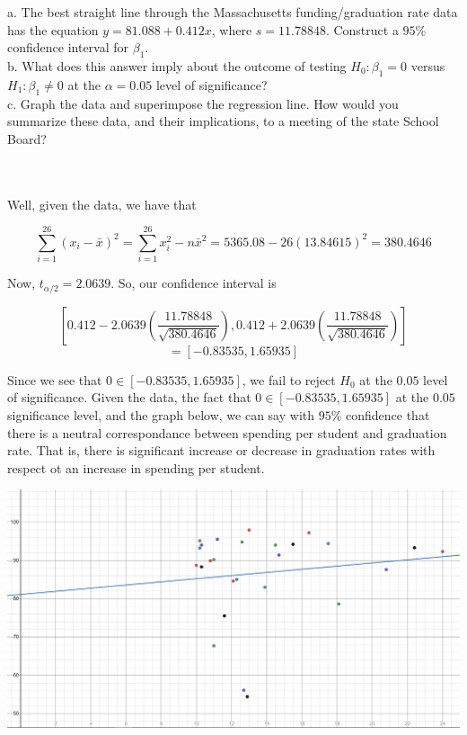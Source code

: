 a. The best straight line through the Massachusetts funding/graduation rate data has the equation
$y=81.088+0.412x$, where $s=11.78848$. Construct a $95\%$ confidence interval for $\beta_1$.\\

b. What does this answer imply about the outcome of testing $H_0:\beta_1=0$ versus $H_1:\beta_1\neq0$ at
the $\alpha=0.05$ level of significance?\\

c. Graph the data and superimpose the regression line. How would you summarize these data, and their
implications, to a meeting of the state School Board?\\\\

\begin{solution}\renewcommand{\qedsymbol}{}\ \\
    Well, given the data, we have that
    
    $$\sum_{i=1}^26(x_i-\bar{x})^2=\sum_{i=1}^26x_i^2-n\bar{x}^2=5365.08-26(13.84615)^2=380.4646$$
    
    Now, $t_{\alpha/2}=2.0639$. So, our confidence interval is
    
    $$[0.412-2.0639(\frac{11.78848}{\sqrt{380.4646}}), 0.412+2.0639(\frac{11.78848}{\sqrt{380.4646}})]$$
    $$=[-0.83535, 1.65935]$$

    Since we see that $0\in[-0.83535, 1.65935]$, we fail to reject $H_0$ at the $0.05$ level of
    significance. Given the data, the fact that $0\in[-0.83535, 1.65935]$ at the $0.05$ significance
    level, and the graph below, we can say with $95\%$ confidence that there is a neutral
    correspondance between spending per student and graduation rate. That is, there is significant
    increase or decrease in graduation rates with respect ot an increase in spending per student.

    \begin{center}
        \includegraphics[scale=0.32]{11-3-2.JPG}\\[20pt]
    \end{center}

\end{solution}